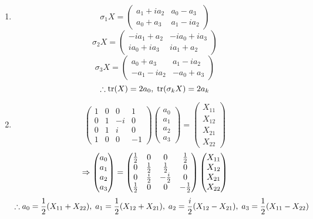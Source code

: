 \begin{enumerate}[labelindent = 0pt, label = (\alph*)]
	\item \[
		\sigma_1 X = \begin{pmatrix}
			a_1 + ia_2 & a_0 -  a_3 \\
			a_0 +  a_3 & a_1 - ia_2
		\end{pmatrix}
	\]
	\[
		\sigma_2 X = \begin{pmatrix}
			-ia_1 +  a_2 & -ia_0 + ia_3 \\
			 ia_0 + ia_3 &  ia_1 +  a_2
		\end{pmatrix}
	\]
	\[
		\sigma_3 X = \begin{pmatrix}
			 a_0 +  a_3 &  a_1 - ia_2 \\
			-a_1 - ia_2 & -a_0 +  a_3
		\end{pmatrix}
	\]
	\[
		\therefore \operatorname{tr}(X) = 2a_0,\; \operatorname{tr}(\sigma_k X) = 2a_k
	\]

	\item \[
		\begin{pmatrix}
			1 & 0 &  0 &  1 \\
			0 & 1 & -i &  0 \\
			0 & 1 &  i &  0 \\
			1 & 0 &  0 & -1
		\end{pmatrix}
		\begin{pmatrix}
			a_0 \\ a_1 \\ a_2 \\ a_3
		\end{pmatrix}
		=
		\begin{pmatrix}
			X_{11} \\ X_{12} \\ X_{21} \\ X_{22}
		\end{pmatrix}
	\]
	\[
		\Rightarrow
		\begin{pmatrix}
			a_0 \\ a_1 \\ a_2 \\ a_3
		\end{pmatrix}
		=
		\begin{pmatrix}
			\frac{1}{2} & 0 & 0 & \frac{1}{2} \\
			0 & \frac{1}{2} & \frac{1}{2} & 0 \\
			0 & \frac{i}{2} & -\frac{i}{2} & 0 \\
			\frac{1}{2} & 0 & 0 & -\frac{1}{2}
		\end{pmatrix}
		\begin{pmatrix}
			X_{11} \\ X_{12} \\ X_{21} \\ X_{22}
		\end{pmatrix}
	\]
	\[
		\therefore
		a_0 = \frac{1}{2}(X_{11} + X_{22}),\;
		a_1 = \frac{1}{2}(X_{12} + X_{21}),\;
		a_2 = \frac{i}{2}(X_{12} - X_{21}),\;
		a_3 = \frac{1}{2}(X_{11} - X_{22})
	\]
\end{enumerate}
